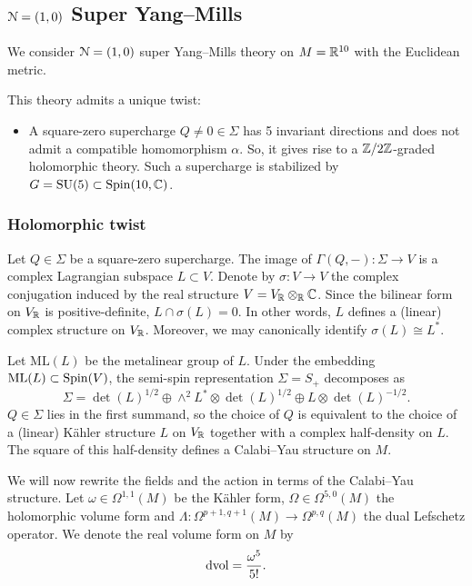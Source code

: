 \documentclass[10pt, oneside]{article}
\newcommand{\ML}{\mathrm{ML}}
\begin{document}
\subsection{\texorpdfstring{$\mathcal N=(1, 0)$}{N=(1,0)} Super Yang--Mills}

We consider $\mathcal N=(1, 0)$ super Yang--Mills theory on $M=\mathbb R^{10}$ with the Euclidean metric.

This theory admits a unique twist:
\begin{itemize}
\item A square-zero supercharge $Q\neq 0\in\Sigma$ has 5 invariant directions and does not admit a compatible homomorphism $\alpha$. So, it gives rise to a $\mathbb Z/2\mathbb Z$-graded holomorphic theory. Such a supercharge is stabilized by $G=\mathrm{SU}(5)\subset \mathrm{Spin}(10, \mathbb C)$.
\end{itemize}

\subsubsection{Holomorphic twist}
\label{sect:10dholomorphictwist}

Let $Q\in\Sigma$ be a square-zero supercharge. The image of $\Gamma(Q, -)\colon \Sigma\rightarrow V$ is a complex Lagrangian subspace $L\subset V$. Denote by $\sigma\colon V\rightarrow V$ the complex conjugation induced by the real structure $V = V_\mathbb R\otimes_\mathbb R\mathbb C$. Since the bilinear form on $V_\mathbb R$ is positive-definite, $L\cap \sigma(L) = 0$. In other words, $L$ defines a (linear) complex structure on $V_\mathbb R$. Moreover, we may canonically identify $\sigma(L)\cong L^*$.

Let $\ML(L)$ be the metalinear group of $L$. Under the embedding $\ML(L)\subset \Spin(V)$, the semi-spin representation $\Sigma=S_+$ decomposes as
\[\Sigma = \det(L)^{1/2} \oplus \wedge^2 L^*\otimes \det(L)^{1/2}\oplus L\otimes \det(L)^{-1/2}.\]
$Q\in\Sigma$ lies in the first summand, so the choice of $Q$ is equivalent to the choice of a (linear) K\"ahler structure $L$ on $V_\mathbb R$ together with a complex half-density on $L$. The square of this half-density defines a Calabi--Yau structure on $M$.

We will now rewrite the fields and the action in terms of the Calabi--Yau structure. Let $\omega\in\Omega^{1, 1}(M)$ be the K\"ahler form, $\Omega\in\Omega^{5, 0}(M)$ the holomorphic volume form and $\Lambda\colon \Omega^{p+1, q+1}(M)\rightarrow \Omega^{p, q}(M)$ the dual Lefschetz operator. We denote the real volume form on $M$ by
\[\operatorname{dvol} = \frac{\omega^5}{5!}.\]
\end{document}
